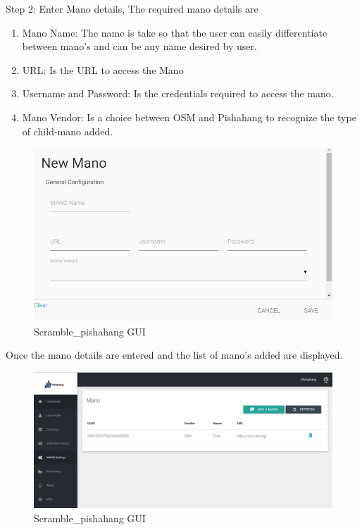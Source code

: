 Step 2: Enter Mano details, The required mano details are 
\begin{enumerate}
	\item Mano Name: The name is take so that the user can easily differentiate between mano's and can be any name desired by user.
	\item URL: Is the URL to access the Mano
	\item Username and Password: Is the credentials required to access the mano.
	\item Mano Vendor: Is a choice between OSM and Pishahang to recognize the type of child-mano added.   
\end{enumerate}
\begin{figure}[H]
	\centering
	\includegraphics[width=1\linewidth]{"figures/son-gui-step-2"}
	\caption{Scramble_pishahang GUI}
	\label{fig:sequence-diagram-scramble}
\end{figure}

Once the mano details are entered and the list of mano's added are displayed.
\begin{figure}[H]
	\centering
	\includegraphics[width=1\linewidth]{"figures/son-gui-step-3"}
	\caption{Scramble_pishahang GUI}
	\label{fig:sequence-diagram-scramble}
\end{figure}

